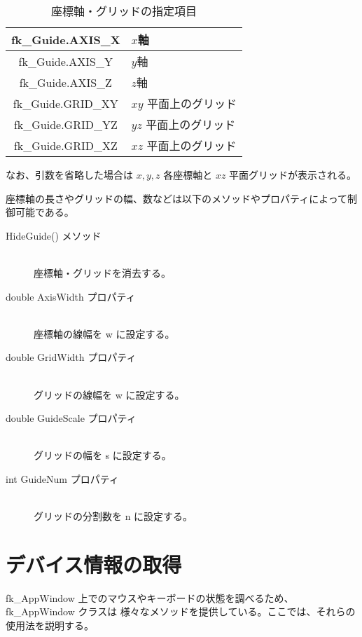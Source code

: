 \begin{table}[H]
\caption{座標軸・グリッドの指定項目}
\label{tbl:fkAxisGrid}
\begin{center}
\begin{tabular}{|c|l|}
\hline
fk\_Guide.AXIS\_X & \(x\)軸 \\ \hline
fk\_Guide.AXIS\_Y & \(y\)軸 \\ \hline
fk\_Guide.AXIS\_Z & \(z\)軸 \\ \hline
fk\_Guide.GRID\_XY & \(xy\) 平面上のグリッド \\ \hline
fk\_Guide.GRID\_YZ & \(yz\) 平面上のグリッド \\ \hline
fk\_Guide.GRID\_XZ & \(xz\) 平面上のグリッド \\ \hline
\end{tabular}
\end{center}
\end{table}

なお、引数を省略した場合は \(x,y,z\) 各座標軸と \(xz\) 平面グリッドが表示される。

座標軸の長さやグリッドの幅、数などは以下のメソッドやプロパティによって制御可能である。

\begin{description}
\item[HideGuide() メソッド] ~ \\
	座標軸・グリッドを消去する。\\

\item[double AxisWidth プロパティ] ~ \\
	座標軸の線幅を w に設定する。\\

\item[double GridWidth プロパティ] ~ \\
	グリッドの線幅を w に設定する。\\

\item[double GuideScale プロパティ] ~ \\
	グリッドの幅を s に設定する。\\

\item[int GuideNum プロパティ] ~ \\
	グリッドの分割数を n に設定する。
\end{description}

\section{デバイス情報の取得} \label{sec:device}
fk\_AppWindow 上でのマウスやキーボードの状態を調べるため、fk\_AppWindow クラスは
様々なメソッドを提供している。ここでは、それらの使用法を説明する。
